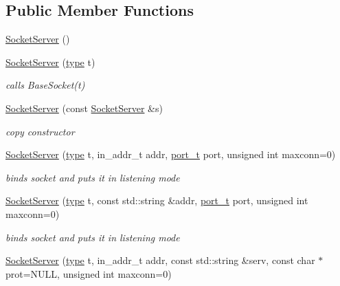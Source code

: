 \subsection*{Public Member Functions}
\begin{CompactItemize}
\item 
\hyperlink{classsocketpp_1_1SocketServer_7a6c01da97c291e40adfcd33a5548c1b}{SocketServer} ()
\item 
\hyperlink{classsocketpp_1_1SocketServer_3a6955b6d5617457cf31206ea9492786}{SocketServer} (\hyperlink{namespacesocketpp_635f4c3b3f85aba331587404d59ae52d}{type} t)
\begin{CompactList}\small\item\em calls BaseSocket(t) \item\end{CompactList}\item 
\hyperlink{classsocketpp_1_1SocketServer_e83ff222d6d4dd600dc162926afdac0f}{SocketServer} (const \hyperlink{classsocketpp_1_1SocketServer}{SocketServer} \&s)
\begin{CompactList}\small\item\em copy constructor \item\end{CompactList}\item 
\hyperlink{classsocketpp_1_1SocketServer_73c5125f9e5a6cf03dc15f6d4250e345}{SocketServer} (\hyperlink{namespacesocketpp_635f4c3b3f85aba331587404d59ae52d}{type} t, in\_\-addr\_\-t addr, \hyperlink{namespacesocketpp_5517ef80f249b891a2ba64b95fc1e723}{port\_\-t} port, unsigned int maxconn=0)
\begin{CompactList}\small\item\em binds socket and puts it in listening mode \item\end{CompactList}\item 
\hyperlink{classsocketpp_1_1SocketServer_2b43397fd614dc7953559d7372f1c6ca}{SocketServer} (\hyperlink{namespacesocketpp_635f4c3b3f85aba331587404d59ae52d}{type} t, const std::string \&addr, \hyperlink{namespacesocketpp_5517ef80f249b891a2ba64b95fc1e723}{port\_\-t} port, unsigned int maxconn=0)
\begin{CompactList}\small\item\em binds socket and puts it in listening mode \item\end{CompactList}\item 
\hyperlink{classsocketpp_1_1SocketServer_594f3a739f4cd053f9fd0512e42473be}{SocketServer} (\hyperlink{namespacesocketpp_635f4c3b3f85aba331587404d59ae52d}{type} t, in\_\-addr\_\-t addr, const std::string \&serv, const char $\ast$prot=NULL, unsigned int maxconn=0)

\end{CompactItemize}
